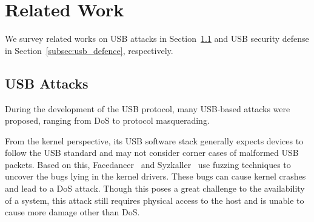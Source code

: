 \section{Related Work}
\label{sec:related_work}

We survey related works on \ac{USB} attacks in Section~\ref{subsec:usb_attack} and
\ac{USB} security defense in Section~\ref{subsec:usb_defence}, respectively.

\subsection{USB Attacks}
\label{subsec:usb_attack}

During the development of the \ac{USB} protocol, many \mbox{\ac{USB}-based} attacks were proposed,
ranging from \ac{DoS} to protocol masquerading.

From the kernel perspective, its \ac{USB} software stack generally expects devices
to follow the \ac{USB} standard and may not consider corner cases of malformed \ac{USB}
packets. Based on this, Facedancer~\cite{facedancer} and
Syzkaller~\cite{syzkaller} use fuzzing techniques to uncover the bugs lying in
the kernel drivers. These bugs can cause kernel crashes and lead to a \ac{DoS} attack.
Though this poses a great challenge to the availability of a system, this
attack still requires physical access to the host and is unable to cause more
damage other than \ac{DoS}.

